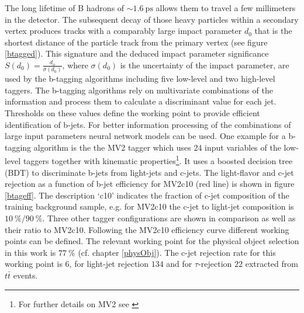 The long lifetime of B hadrons of $\sim\SI{1.6}{\pico\second}$ allows them to travel a few millimeters in the detector. The subsequent decay of those heavy particles within a secondary vertex produces tracks with a comparably large impact parameter $d_0$ that is the shortest distance of the particle track from the primary vertex (see figure \ref{btagged}). This signature and the deduced impact parameter significance $S(d_0)=\frac{d_o}{\sigma(d_0)}$, where $\sigma(d_0)$ is the uncertainty of the impact parameter, are used by the b-tagging algorithms including five low-level and two high-level taggers. \cite{Hansson} The b-tagging algorithms rely on multivariate combinations of the information and process them to calculate a discriminant value for each jet. Thresholds on these values define the working point to provide efficient identification of b-jets. For better information processing of the combinations of large input parameters neural network models can be used. \cite{Luca} One example for a b-tagging algorithm is the the MV2 tagger which uses 24 input variables of the low-level taggers together with kinematic properties\footnote{For further details on MV2 see \cite{MV2}}. \cite{Paganini} It uses a boosted decision tree (BDT) to discriminate b-jets from light-jets and c-jets. \cite{MV2} The light-flavor and c-jet rejection as a function of b-jet efficiency for MV2c10 (red line) is shown in figure \ref{btageff}. The description `c10' indicates the fraction of c-jet composition of the training background sample, e.g. for MV2c10 the c-jet to light-jet composition is $\SI{10}{\percent}/\SI{90}{\percent}$. Three other tagger configurations are shown in comparison as well as their ratio to MV2c10. Following the MV2c10 efficiency curve different working points can be defined. The relevant working point for the physical object selection in this work is $\SI{77}{\percent}$ (cf. chapter \ref{physObj}). The c-jet rejection rate for this working point is $6$, for light-jet rejection $134$ and for $\tau$-rejection $22$ extracted from $t\bar{t}$ events. \cite{MV2c10}    
